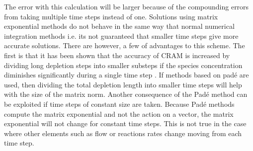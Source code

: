 \noindent The error with this calculation will be larger because of the compounding errors from taking multiple time steps instead of one. Solutions using matrix exponential methods do not behave in the same way that normal numerical integration methods i.e. its not guaranteed that smaller time steps give more accurate solutions. There are however, a few of advantages to this scheme. The first is that it has been shown that the accuracy of CRAM is increased by dividing long depletion steps into smaller substeps if the species concentration diminishes significantly during a single time step \cite{isotalo2016}. If methods based on pad\'e are used, then dividing the total depletion length into smaller time steps will help with the size of the matrix norm. Another consequence of the Pad\'e method can be exploited if time steps of constant size are taken. Because Pad\'e methods compute the matrix exponential and not the action on a vector, the matrix exponential will not change for constant time steps. This is not true in the case where other elements such as flow or reactions rates change moving from each time step. 